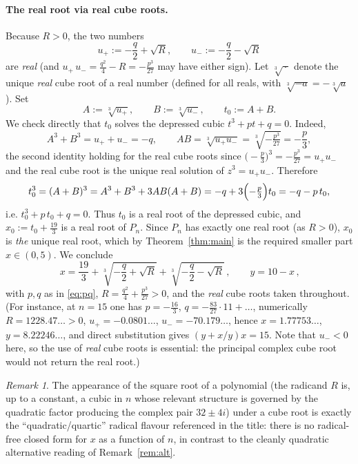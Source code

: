 \documentclass{amsart}
\theoremstyle{remark}
\newtheorem{remark}{Remark}
\begin{document}
\paragraph{The real root via real cube roots.}
Because $R>0$, the two numbers
\[
u_+:=-\frac{q}{2}+\sqrt{R},\qquad u_-:=-\frac{q}{2}-\sqrt{R}
\]
are \emph{real} (and $u_+\,u_-=\tfrac{q^2}{4}-R=-\tfrac{p^3}{27}$ may have either
sign). Let $\sqrt[3]{\,\cdot\,}$ denote the unique \emph{real} cube root of a
real number (defined for all reals, with $\sqrt[3]{-a}=-\sqrt[3]{a}$). Set
\[
A:=\sqrt[3]{u_+},\qquad B:=\sqrt[3]{u_-},\qquad t_0:=A+B .
\]
We check directly that $t_0$ solves the depressed cubic $t^3+pt+q=0$. Indeed,
\[
A^3+B^3=u_++u_-=-q,\qquad
AB=\sqrt[3]{u_+u_-}=\sqrt[3]{-\tfrac{p^3}{27}}=-\frac{p}{3},
\]
the second identity holding for the real cube roots since
$\bigl(-\tfrac{p}{3}\bigr)^3=-\tfrac{p^3}{27}=u_+u_-$ and the real cube root is
the unique real solution of $z^3=u_+u_-$. Therefore
\[
t_0^{3}=(A+B)^3=A^3+B^3+3AB(A+B)=-q+3\Bigl(-\tfrac{p}{3}\Bigr)t_0=-q-p\,t_0,
\]
i.e. $t_0^{3}+p\,t_0+q=0$. Thus $t_0$ is a real root of the depressed cubic, and
$x_0:=t_0+\tfrac{19}{3}$ is a real root of $P_n$. Since $P_n$ has exactly one
real root (as $R>0$), $x_0$ is \emph{the} unique real root, which by
Theorem~\ref{thm:main} is the required smaller part $x\in(0,5)$. We conclude
\begin{equation}\label{eq:cardano}
\boxed{\,x=\frac{19}{3}
   +\sqrt[3]{-\frac{q}{2}+\sqrt{R}}
   +\sqrt[3]{-\frac{q}{2}-\sqrt{R}}\,,
\qquad y=10-x\,,}
\end{equation}
with $p,q$ as in \eqref{eq:pq}, $R=\frac{q^2}{4}+\frac{p^3}{27}>0$, and the
\emph{real} cube roots taken throughout. (For instance, at $n=15$ one has
$p=-\tfrac{16}{3}$, $q=-\tfrac{83}{27}\cdot 11+\dots$, numerically
$R=1228.47\ldots>0$, $u_+=-0.0801\ldots$, $u_-=-70.179\ldots$, hence
$x=1.77753\ldots$, $y=8.22246\ldots$, and direct substitution gives
$(y+x/y)x=15$. Note that $u_-<0$ here, so the use of \emph{real} cube roots is
essential: the principal complex cube root would not return the real root.)

\begin{remark}
The appearance of the square root of a polynomial (the radicand $R$ is, up to a
constant, a cubic in $n$ whose relevant structure is governed by the quadratic
factor producing the complex pair $32\pm4i$) under a cube root is exactly the
``quadratic/quartic'' radical flavour referenced in the title: there is no
radical-free closed form for $x$ as a function of $n$, in contrast to the
cleanly quadratic alternative reading of Remark~\ref{rem:alt}.
\end{remark}
\end{document}
